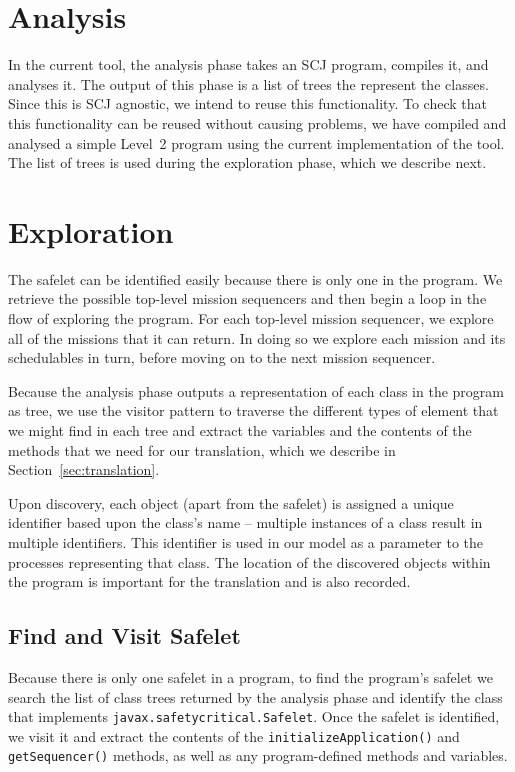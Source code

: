 \documentclass[10pt,a4paper]{article}
\begin{document}
\section{Analysis}
\label{sec:analysis}

In the current tool, the analysis phase takes an SCJ program, compiles it, and analyses it. The output of this phase is a list of trees the represent the classes. Since this is SCJ agnostic, we intend to reuse this functionality. To check that this functionality can be reused without causing problems, we have compiled and analysed a simple Level~2 program using the current implementation of the tool. The list of trees is used during the exploration phase, which we describe next.

\section{Exploration}
\label{sec:exploration}


The safelet can be identified easily because there is only one in the program. We retrieve the possible top-level mission sequencers and then begin a loop in the flow of exploring the program. For each top-level mission sequencer, we explore all of the missions that it can return. In doing so we explore each mission and its schedulables in turn, before moving on to the next mission sequencer. 

Because the analysis phase outputs a representation of each class in the program as tree, we use the visitor pattern to traverse the different types of element that we might find in each tree and extract the variables and the contents of the methods that we need for our translation, which we describe in Section~\ref{sec:translation}.

Upon discovery, each object (apart from the safelet) is assigned a unique identifier based upon the class's name -- multiple instances of a class result in multiple identifiers. This identifier is used in our model as a parameter to the processes representing that class. The location of the discovered objects within the program is important for the translation and is also recorded.

\subsection{Find and Visit Safelet}

Because there is only one safelet in a program, to find the program's safelet we search the list of class trees returned by the analysis phase and identify the class that implements \texttt{javax.safetycritical.Safelet}. Once the safelet is identified, we visit it and extract the contents of the \texttt{initializeApplication()} and \texttt{getSequencer()} methods, as well as any program-defined methods and variables. 
\end{document}
